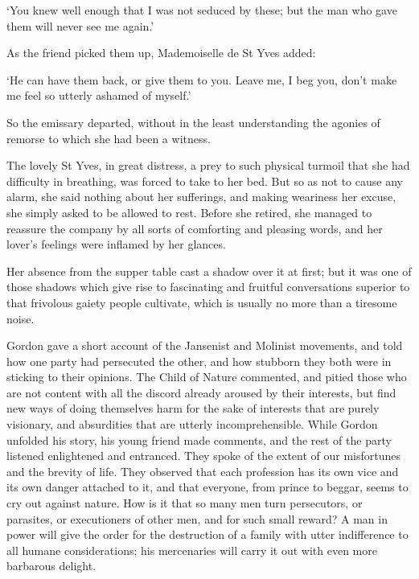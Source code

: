 \documentclass{article}
\begin{document}
\begin{center}
`You knew well enough that I was not seduced by these; but the man who gave them 
will never see me again.' 

As the friend picked them up, Mademoiselle de St Yves added: 

`He can have them back, or give them to you. Leave me, I beg you, don't make me 
feel so utterly ashamed of myself.' 

So the emissary departed, without in the least understanding the agonies of remorse 
to which she had been a witness. 

The lovely St Yves, in great distress, a prey to such physical turmoil that she 
had difficulty in breathing, was forced to take to her bed. But so as not to cause 
any alarm, she said nothing about her sufferings, and making weariness her excuse, 
she simply asked to be allowed to rest. Before she retired, she managed to reassure 
the company by all sorts of comforting and pleasing words, and her lover's feelings 
were inflamed by her glances. 

Her absence from the supper table cast a shadow over it at first; but it was one 
of those shadows which give rise to fascinating and fruitful conversations superior 
to that frivolous gaiety people cultivate, which is usually no more than a tiresome 
noise. 

Gordon gave a short account of the Jansenist and Molinist movements, and told how 
one party had persecuted the other, and how stubborn they both were in sticking 
to their opinions. The Child of Nature commented, and pitied those who are not 
content with all the discord already aroused by their interests, but find new ways 
of doing themselves harm for the sake of interests that are purely visionary, and 
absurdities that are utterly incomprehensible. While Gordon unfolded his story, 
his young friend made comments, and the rest of the party listened enlightened 
and entranced. They spoke of the extent of our misfortunes and the brevity of life. 
They observed that each profession has its own vice and its own danger attached 
to it, and that everyone, from prince to beggar, seems to cry out against nature. 
How is it that so many men turn persecutors, or parasites, or executioners of other 
men, and for such small reward? A man in power will give the order for the destruction 
of a family with utter indifference to all humane considerations; his mercenaries 
will carry it out with even more barbarous delight. 


\end{center}
\end{document}
